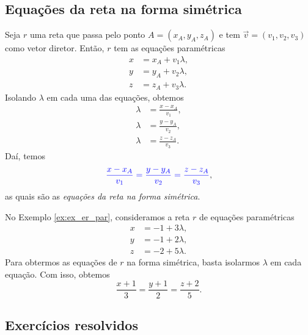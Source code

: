 \subsection{Equações da reta na forma simétrica}

Seja $r$ uma reta que passa pelo ponto $A = (x_A,y_A,z_A)$ e tem $\vec{v} = (v_1,v_2,v_3)$ como vetor diretor. Então, $r$ tem as equações paramétricas
\begin{align}
  x &= x_A + v_1\lambda,\\
  y &= y_A + v_2\lambda,\\
  z &= z_A + v_3\lambda.
\end{align}
Isolando $\lambda$ em cada uma das equações, obtemos
\begin{align}
  \lambda &= \frac{x-x_A}{v_1},\\
  \lambda &= \frac{y-y_A}{v_2},\\
  \lambda &= \frac{z-z_A}{v_3}.
\end{align}
Daí, temos
\begin{equation}
  {\color{blue}\frac{x-x_A}{v_1} = \frac{y-y_A}{v_2} = \frac{z-z_A}{v_3}},
\end{equation}
as quais são as \emph{equações da reta na forma simétrica}.

\begin{ex}
  No Exemplo \ref{ex:ex_er_par}, consideramos a reta $r$ de equações paramétricas
  \begin{align}
    x &= -1 + 3\lambda,\\
    y &= -1 + 2\lambda,\\
    z &= -2 + 5\lambda.    
  \end{align}
  Para obtermos as equações de $r$ na forma simétrica, basta isolarmos $\lambda$ em cada equação. Com isso, obtemos
  \begin{equation}
    \frac{x+1}{3} = \frac{y+1}{2} = \frac{z+2}{5}.
  \end{equation}
\end{ex}

\subsection*{Exercícios resolvidos}

